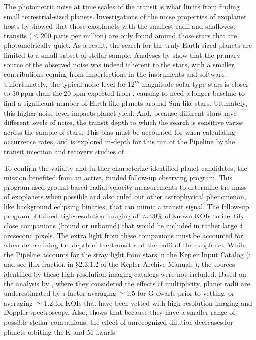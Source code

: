 The photometric noise at time scales of the transit is what limits \Kepler{} from finding small terrestrial-sized planets. Investigations of the noise properties of \Kepler{} exoplanet hosts by \citet{Howell2016} showed that those exoplanets with the smallest radii and shallowest transits ($\leq 200$ parts per million) are only found around those stars that are photometrically quiet. As a result, the search for the truly Earth-sized planets are limited to a small subset of  stellar sample.  Analyses by \citet{Gilliland2011,Gilliland2015} show that the primary source of the observed noise was indeed inherent to the stars, with a smaller contributions coming from imperfections in the instruments and software. Unfortunately, the typical noise level for 12$^{th}$ magnitude solar-type stars is closer to 30\,ppm \citep{Gilliland2015} than the 20\,ppm expected from \citet{Jenkins2002a}, causing \Kepler{} to need a longer baseline to find a significant number of Earth-like planets around Sun-like stars.   Ultimately, this higher noise level impacts  planet yield. And, because different stars have different levels of noise, the transit depth to which the search is sensitive varies across the sample of stars. This bias must be accounted for when calculating occurrence rates, and is explored in-depth for this run of the \Kepler{} Pipeline by the transit injection and recovery studies of \citet[][]{Burke2017b,Burke2017a,Christiansen2017}.
 

To confirm the validity and further characterize identified planet candidates, the \Kepler{} mission benefited from an active, funded follow-up observing program. This program used ground-based radial velocity measurements to determine the mass of exoplanets \citep[e.g.,][]{Marcy2014} when possible and also ruled out other astrophysical phenomenon, like background eclipsing binaries, that can mimic a transit signal.  The follow-up program obtained high-resolution imaging of $\approx$90\% of known KOIs \citep[e.g.,][]{Furlan2017} to identify close companions (bound or unbound) that would be included in  rather large 4 arcsecond pixels.  The extra light from these companions must be accounted for when determining the depth of the transit and the radii of the exoplanet.  While the \Kepler{} Pipeline accounts for the stray light from stars in the Kepler Input Catalog (\citealt{Brown2011}; and see flux fraction in \S2.3.1.2 of the Kepler Archive Manual; \citealt{Thompson2016KAM}), the sources identified by these high-resolution imaging catalogs were not included. Based on the analysis by \citet{Ciardi2015}, where they considered the effects of multiplicity, planet radii are underestimated by a factor averaging\,$\simeq$1.5 for G dwarfs prior to vetting, or averaging $\simeq$1.2 for KOIs that have been vetted with high-resolution imaging and Doppler spectroscopy.  Also, \citet{Ciardi2015} shows that because they have a smaller range of possible stellar companions, the effect of unrecognized dilution decreases for planets orbiting the K and M dwarfs.

